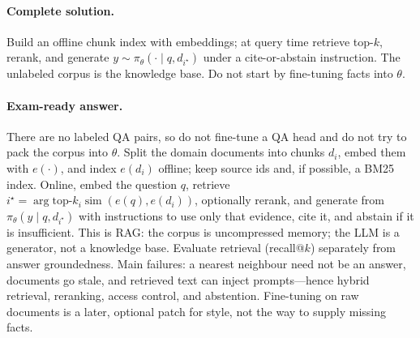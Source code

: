 \documentclass[11pt,a4paper]{article}
\theoremstyle{definition}
\begin{document}
\paragraph{Complete solution.}
Build an offline chunk index with embeddings; at query time retrieve top-\(k\), rerank, and generate \(y\sim\pi_\theta(\cdot\mid q,d_{i^\star})\) under a cite-or-abstain instruction. The unlabeled corpus is the knowledge base. Do not start by fine-tuning facts into \(\theta\).

\paragraph{Exam-ready answer.}
There are no labeled QA pairs, so do not fine-tune a QA head and do not try to pack the corpus into \(\theta\). Split the domain documents into chunks \(d_i\), embed them with \(e(\cdot)\), and index \(e(d_i)\) offline; keep source ids and, if possible, a BM25 index. Online, embed the question \(q\), retrieve \(i^\star=\arg\mathrm{top}\text{-}k_i\operatorname{sim}(e(q),e(d_i))\), optionally rerank, and generate from \(\pi_\theta(y\mid q,d_{i^\star})\) with instructions to use only that evidence, cite it, and abstain if it is insufficient. This is RAG: the corpus is uncompressed memory; the LLM is a generator, not a knowledge base. Evaluate retrieval (recall@\(k\)) separately from answer groundedness. Main failures: a nearest neighbour need not be an answer, documents go stale, and retrieved text can inject prompts---hence hybrid retrieval, reranking, access control, and abstention. Fine-tuning on raw documents is a later, optional patch for style, not the way to supply missing facts.


\end{document}
